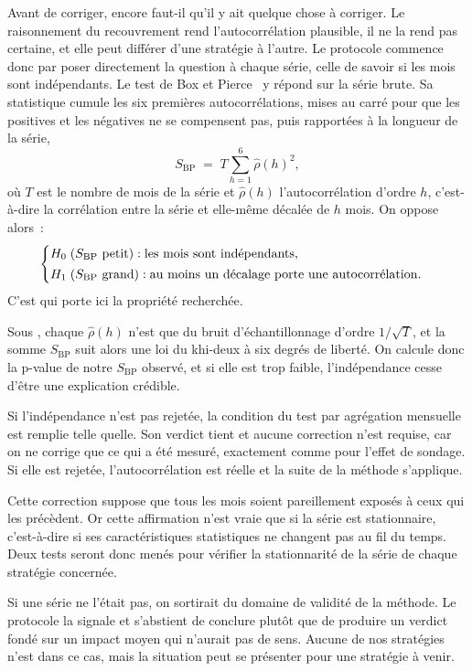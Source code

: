 Avant de corriger, encore faut-il qu'il y ait quelque chose à corriger. Le
raisonnement du recouvrement rend l'autocorrélation plausible, il ne la rend
pas certaine, et elle peut différer d'une stratégie à l'autre. Le protocole
commence donc par poser directement la question à chaque série, celle de
savoir si les mois sont indépendants. Le test de Box et
Pierce~\cite{boxpierce1970} y répond sur la série brute. Sa statistique cumule
les six premières autocorrélations, mises au carré pour que les positives et
les négatives ne se compensent pas, puis rapportées à la longueur de la
série,
\[
  S_{\mathrm{BP}} \;=\; T \sum_{h=1}^{6} \hat\rho(h)^2 ,
\]
où \(T\) est le nombre de mois de la série et \(\hat\rho(h)\)
l'autocorrélation d'ordre \(h\), c'est-à-dire la corrélation entre la série
et elle-même décalée de \(h\) mois. On oppose alors~:
\[
  \begin{cases}
    H_0 \;(S_{\mathrm{BP}} \text{ petit}) : \text{les mois sont indépendants,}\\[2pt]
    H_1 \;(S_{\mathrm{BP}} \text{ grand}) : \text{au moins un décalage porte une autocorrélation.}
  \end{cases}
\]
C'est \Hzero{} qui porte ici la propriété recherchée.

Sous \Hzero{}, chaque $\hat\rho(h)$ n'est que du bruit d'échantillonnage
d'ordre $1/\sqrt{T}$, et la somme $S_{\mathrm{BP}}$ suit alors une loi du
khi-deux à six degrés de liberté. On calcule donc la p-value de notre
$S_{\mathrm{BP}}$ observé, et si elle est trop faible, l'indépendance cesse
d'être une explication crédible.

Si l'indépendance n'est pas rejetée, la condition du test par agrégation
mensuelle est remplie telle quelle. Son verdict tient et aucune correction
n'est requise, car on ne corrige que ce qui a été mesuré, exactement comme
pour l'effet de sondage. Si elle est rejetée, l'autocorrélation est réelle et
la suite de la méthode s'applique.

Cette correction suppose que tous les mois soient pareillement exposés à ceux
qui les précèdent. Or cette affirmation n'est vraie que si la série est
stationnaire, c'est-à-dire si ses caractéristiques statistiques ne changent
pas au fil du temps. Deux tests seront donc menés pour vérifier la
stationnarité de la série de chaque stratégie concernée.

Si une série ne l'était pas, on sortirait du domaine de validité de la
méthode. Le protocole la signale et s'abstient de conclure plutôt que de
produire un verdict fondé sur un impact moyen qui n'aurait pas de sens. Aucune
de nos stratégies n'est dans ce cas, mais la situation peut se présenter pour
une stratégie à venir.

